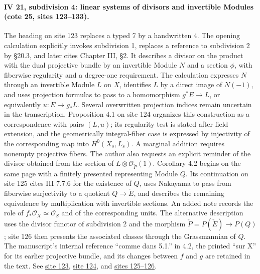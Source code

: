 \paragraph{IV 21, subdivision 4: linear systems of divisors and invertible Modules (cote 25, sites 123--133).}
The heading on site 123 replaces a typed 7 by a handwritten 4. The opening calculation explicitly invokes subdivision 1, replaces a reference to subdivision 2 by \S20.3, and later cites Chapter III, \S2. It describes a divisor on the product with the dual projective bundle by an invertible Module \(N\) and a section \(\phi\), with fiberwise regularity and a degree-one requirement. The calculation expresses \(N\) through an invertible Module \(L\) on \(X\), identifies \(L\) by a direct image of \(N(-1)\), and uses projection formulas to pass to a homomorphism \(g^*E\longrightarrow L\), or equivalently \(u:E\longrightarrow g_*L\). Several overwritten projection indices remain uncertain in the transcription. Proposition 4.1 on site 124 organizes this construction as a correspondence with pairs \((L,u)\); its regularity test is stated after field extension, and the geometrically integral-fiber case is expressed by injectivity of the corresponding map into \(H^0(X_s,L_s)\). A marginal addition requires nonempty projective fibers. The author also requests an explicit reminder of the divisor obtained from the section of \(L\otimes\mathcal O_{\check P}(1)\). Corollary 4.2 begins on the same page with a finitely presented representing Module \(Q\). Its continuation on site 125 cites III 7.7.6 for the existence of \(Q\), uses Nakayama to pass from fiberwise surjectivity to a quotient \(Q\longrightarrow\check E\), and describes the remaining equivalence by multiplication with invertible sections. An added note records the role of \(f_*\mathcal O_X\simeq\mathcal O_S\) and of the corresponding units. The alternative description uses the divisor functor of subdivision 2 and the morphism \(\check P=P(\check E)\longrightarrow P(Q)\); site 126 then presents the associated classes through the Grassmannian of \(Q\). The manuscript's internal reference ``comme dans 5.1.'' in 4.2, the printed ``sur X'' for its earlier projective bundle, and its changes between \(f\) and \(g\) are retained in the text. See \href{https://grothendieck.umontpellier.fr/web/viewer.html?file=../25.pdf#page=124}{site 123}, \href{https://grothendieck.umontpellier.fr/web/viewer.html?file=../25.pdf#page=125}{site 124}, and \href{https://grothendieck.umontpellier.fr/web/viewer.html?file=../25.pdf#page=126}{sites 125--126}.

